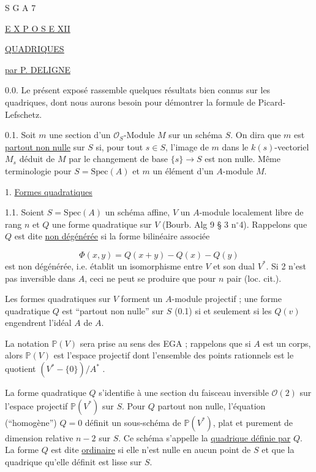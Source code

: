 


S G A 7


\underline{E X P O S E XII}


\underline{\underline{QUADRIQUES}}


\underline{par P. DELIGNE}

0.0. Le présent exposé rassemble quelques résultats bien connus sur les quadriques, dont nous aurons besoin pour démontrer la formule de Picard-Lefschetz.

0.1. Soit $m$ une section d'un $\mathcal{O}_S$-Module $M$ sur un schéma $S$. On dira que $m$ est \underline{partout non nulle} sur $S$ si, pour tout $s \in S$, l'image de $m$ dans le $k(s)$-vectoriel $M_s$ déduit de $M$ par le changement de base $\{s\} \longrightarrow S$ est non nulle. Même terminologie pour $S = \mathrm{Spec}(A)$ et $m$ un élément d'un $A$-module $M$.


1. \underline{Formes quadratiques}

1.1. Soient $S = \mathrm{Spec}(A)$ un schéma affine, $V$ un $A$-module localement libre de rang $n$ et $Q$ une forme quadratique sur $V$ (Bourb. Alg 9 \S{} 3 n$^\circ$4). Rappelons que $Q$ est dite \underline{non dégénérée} si la forme bilinéaire associée

\begin{equation*}
\Phi(x,y) = Q(x+y) - Q(x) - Q(y)
\end{equation*}
est non dégénérée, i.e. établit un isomorphisme entre $V$ et son dual $V^*$. Si 2 n'est pas inversible dans $A$, ceci ne peut se produire que pour $n$ pair (loc. cit.).



Les formes quadratiques sur $V$ forment un $A$-module projectif ; une forme quadratique $Q$ est ``partout non nulle'' sur $S$ (0.1) si et seulement si les $Q(v)$ engendrent l'idéal $A$ de $A$.

La notation $\mathbb{P}(V)$ sera prise au sens des EGA ; rappelons que si $A$ est un corps, alors $\mathbb{P}(V)$ est l'espace projectif dont l'ensemble des points rationnels est le quotient $(V^* - \{0\})/A^*$ .

La forme quadratique $Q$ s'identifie à une section du faisceau inversible $\mathcal{O}(2)$ sur l'espace projectif $\mathbb{P}(V^*)$ sur $S$. Pour $Q$ partout non nulle, l'équation (``homogène'') $Q = 0$ définit un sous-schéma de $\mathbb{P}(V^*)$, plat et purement de dimension relative $n-2$ sur $S$. Ce schéma s'appelle la \underline{quadrique définie par} $Q$. La forme $Q$ est dite \underline{ordinaire} si elle n'est nulle en aucun point de $S$ et que la quadrique qu'elle définit est lisse sur $S$.

